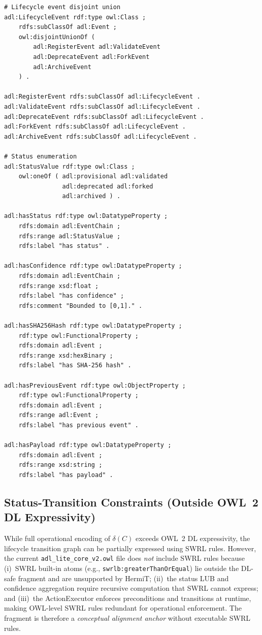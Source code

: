 \begin{lstlisting}[language=turtle, caption={Lifecycle events, status, and cryptographic properties.}, label={lst:owl-dl-lifecycle}]
# Lifecycle event disjoint union
adl:LifecycleEvent rdf:type owl:Class ;
    rdfs:subClassOf adl:Event ;
    owl:disjointUnionOf (
        adl:RegisterEvent adl:ValidateEvent
        adl:DeprecateEvent adl:ForkEvent
        adl:ArchiveEvent
    ) .

adl:RegisterEvent rdfs:subClassOf adl:LifecycleEvent .
adl:ValidateEvent rdfs:subClassOf adl:LifecycleEvent .
adl:DeprecateEvent rdfs:subClassOf adl:LifecycleEvent .
adl:ForkEvent rdfs:subClassOf adl:LifecycleEvent .
adl:ArchiveEvent rdfs:subClassOf adl:LifecycleEvent .

# Status enumeration
adl:StatusValue rdf:type owl:Class ;
    owl:oneOf ( adl:provisional adl:validated
                adl:deprecated adl:forked
                adl:archived ) .

adl:hasStatus rdf:type owl:DatatypeProperty ;
    rdfs:domain adl:EventChain ;
    rdfs:range adl:StatusValue ;
    rdfs:label "has status" .

adl:hasConfidence rdf:type owl:DatatypeProperty ;
    rdfs:domain adl:EventChain ;
    rdfs:range xsd:float ;
    rdfs:label "has confidence" ;
    rdfs:comment "Bounded to [0,1]." .

adl:hasSHA256Hash rdf:type owl:DatatypeProperty ;
    rdf:type owl:FunctionalProperty ;
    rdfs:domain adl:Event ;
    rdfs:range xsd:hexBinary ;
    rdfs:label "has SHA-256 hash" .

adl:hasPreviousEvent rdf:type owl:ObjectProperty ;
    rdf:type owl:FunctionalProperty ;
    rdfs:domain adl:Event ;
    rdfs:range adl:Event ;
    rdfs:label "has previous event" .

adl:hasPayload rdf:type owl:DatatypeProperty ;
    rdfs:domain adl:Event ;
    rdfs:range xsd:string ;
    rdfs:label "has payload" .
\end{lstlisting}

\subsection{Status-Transition Constraints (Outside OWL~2 DL Expressivity)}

While full operational encoding of $\delta(C)$ exceeds OWL~2 DL expressivity, the lifecycle transition graph can be partially expressed using SWRL rules. However, the current \texttt{adl\_lite\_core\_v2.owl} file does \emph{not} include SWRL rules because (i)~SWRL built-in atoms (e.g., \texttt{swrlb:greaterThanOrEqual}) lie outside the DL-safe fragment and are unsupported by HermiT; (ii)~the status LUB and confidence aggregation require recursive computation that SWRL cannot express; and (iii)~the ActionExecutor enforces preconditions and transitions at runtime, making OWL-level SWRL rules redundant for operational enforcement. The fragment is therefore a \emph{conceptual alignment anchor} without executable SWRL rules.

